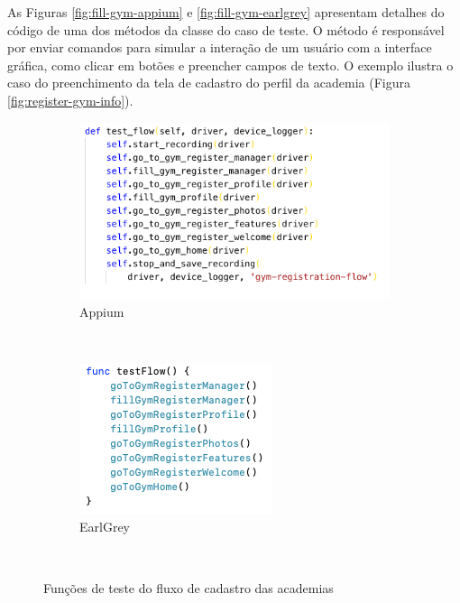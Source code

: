 As Figuras \ref{fig:fill-gym-appium} e \ref{fig:fill-gym-earlgrey} apresentam detalhes do código de uma dos métodos da classe do caso de teste. O método é responsável por enviar comandos para simular a interação de um usuário com a interface gráfica, como clicar em botões e preencher campos de texto. O exemplo ilustra o caso do preenchimento da tela de cadastro do perfil da academia (Figura \ref{fig:register-gym-info}).

\begin{figure}[H]
	\centering
    \begin{subfigure}[b]{0.5\textwidth}
        \includegraphics[width=\textwidth]{pfc/figuras/test-flow-appium.png}
        \caption{Appium}
        \label{fig:test-flow-appium}
    \end{subfigure}
    ~
	\begin{subfigure}[b]{0.3\textwidth}
        \includegraphics[width=\textwidth]{pfc/figuras/test-flow-earlgrey.png}
        \caption{EarlGrey}
        \label{fig:test-flow-earlgrey}
    \end{subfigure}
    ~
    \caption{Funções de teste do fluxo de cadastro das academias}
    \label{fig:test-flow}
\end{figure}

